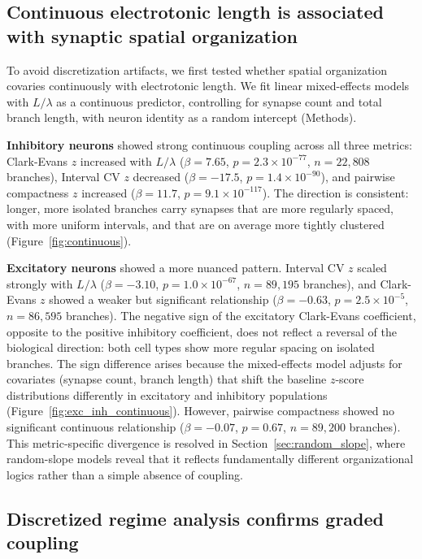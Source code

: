 \documentclass[11pt]{article}
\begin{document}
\subsection{Continuous electrotonic length is associated with synaptic spatial organization}
\label{sec:continuous}

To avoid discretization artifacts, we first tested whether spatial organization covaries continuously with electrotonic length. We fit linear mixed-effects models with $L/\lambda$ as a continuous predictor, controlling for synapse count and total branch length, with neuron identity as a random intercept (Methods).

\textbf{Inhibitory neurons} showed strong continuous coupling across all three metrics: Clark-Evans $z$ increased with $L/\lambda$ ($\beta = 7.65$, $p = 2.3 \times 10^{-77}$, $n = 22{,}808$ branches), Interval CV $z$ decreased ($\beta = -17.5$, $p = 1.4 \times 10^{-90}$), and pairwise compactness $z$ increased ($\beta = 11.7$, $p = 9.1 \times 10^{-117}$). The direction is consistent: longer, more isolated branches carry synapses that are more regularly spaced, with more uniform intervals, and that are on average more tightly clustered (Figure~\ref{fig:continuous}).

\textbf{Excitatory neurons} showed a more nuanced pattern. Interval CV $z$ scaled strongly with $L/\lambda$ ($\beta = -3.10$, $p = 1.0 \times 10^{-67}$, $n = 89{,}195$ branches), and Clark-Evans $z$ showed a weaker but significant relationship ($\beta = -0.63$, $p = 2.5 \times 10^{-5}$, $n = 86{,}595$ branches). The negative sign of the excitatory Clark-Evans coefficient, opposite to the positive inhibitory coefficient, does not reflect a reversal of the biological direction: both cell types show more regular spacing on isolated branches. The sign difference arises because the mixed-effects model adjusts for covariates (synapse count, branch length) that shift the baseline $z$-score distributions differently in excitatory and inhibitory populations (Figure~\ref{fig:exc_inh_continuous}). However, pairwise compactness showed no significant continuous relationship ($\beta = -0.07$, $p = 0.67$, $n = 89{,}200$ branches). This metric-specific divergence is resolved in Section~\ref{sec:random_slope}, where random-slope models reveal that it reflects fundamentally different organizational logics rather than a simple absence of coupling.


\subsection{Discretized regime analysis confirms graded coupling}
\label{sec:regime}
\end{document}
